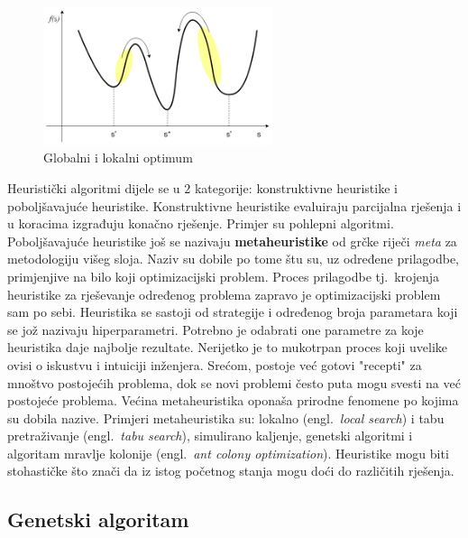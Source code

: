 \documentclass[times, utf8, diplomski]{fer}
\begin{document}
\begin{figure}[htb]
	\centering
	\includegraphics[width=0.6\textwidth]{img/optimum.png}
	\caption{Globalni i lokalni optimum}
	\label{fig:optimum}
\end{figure}

Heuristički algoritmi dijele se u $2$ kategorije: konstruktivne heuristike i poboljšavajuće heuristike. Konstruktivne heuristike evaluiraju parcijalna rješenja i u koracima izgrađuju konačno rješenje. Primjer su pohlepni algoritmi. Poboljšavajuće heuristike još se nazivaju \textbf{metaheuristike} od grčke riječi \textit{meta} za metodologiju višeg sloja. Naziv su dobile po tome štu su, uz određene prilagodbe, primjenjive na bilo koji optimizacijski problem. Proces prilagodbe tj.~krojenja heuristike za rješevanje određenog problema zapravo je optimizacijski problem sam po sebi. Heuristika se sastoji od strategije i određenog broja parametara koji se jož nazivaju hiperparametri. Potrebno je odabrati one parametre za koje heuristika daje najbolje rezultate. Nerijetko je to mukotrpan proces koji uvelike ovisi o iskustvu i intuiciji inženjera. Srećom, postoje već gotovi "recepti" za mnoštvo postojećih problema, dok se novi problemi često puta mogu svesti na već postojeće problema. Većina metaheuristika oponaša prirodne fenomene po kojima su dobila nazive. Primjeri metaheuristika su: lokalno (engl.~\textit{local search}) i tabu pretraživanje (engl.~\textit{tabu search}), simulirano kaljenje, genetski algoritmi i algoritam mravlje kolonije (engl.~\textit{ant colony optimization}). Heuristike mogu biti stohastičke što znači da iz istog početnog stanja mogu doći do različitih rješenja.

\subsection{Genetski algoritam}
\end{document}
